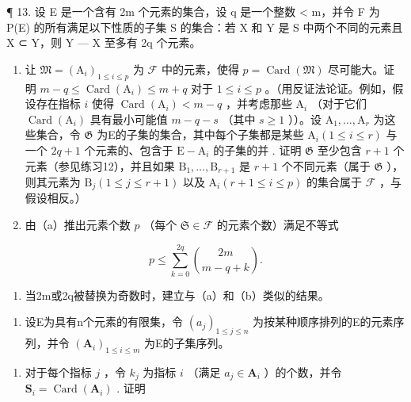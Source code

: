 ¶ 13. 设 E 是一个含有 2m 个元素的集合，设 q 是一个整数 \textless{} m，并令 F 为 P(E) 的所有满足以下性质的子集 S 的集合：若 X 和 Y 是 S 中两个不同的元素且 X ⊂ Y，则 Y --- X 至多有 2q 个元素。

\begin{enumerate}
\def\labelenumi{(\alph{enumi})}
\item
  让 \(\mathfrak{M} = (\mathrm{A}_i)_{1\leqslant i\leqslant p}\) 为 \(\mathcal{F}\) 中的元素，使得 \(p = \operatorname{Card}(\mathfrak{M})\) 尽可能大。证明 \(m - q\leqslant \operatorname{Card}(\mathrm{A}_i)\leqslant m + q\) 对于 \(1\leqslant i\leqslant p\) 。（用反证法论证。例如，假设存在指标 \(i\) 使得 \(\operatorname{Card}(\mathrm{A}_i) < m - q\) ，并考虑那些 \(\mathrm{A}_i\) （对于它们 \(\operatorname{Card}(\mathrm{A}_i)\) 具有最小可能值 \(m - q - s\) （其中 \(s\geqslant 1\) ））。设 \(\mathrm{A}_1,\ldots ,\mathrm{A}_r\) 为这些集合，令 \(\mathfrak{G}\) 为E的子集的集合，其中每个子集都是某些 \(\mathrm{A}_i(1\leqslant i\leqslant r)\) 与一个 \(2q + 1\) 个元素的、包含于 \(\mathrm{E} - \mathrm{A}_i\) 的子集的并 . 证明 \(\mathfrak{G}\) 至少包含 \(r + 1\) 个元素（参见练习12），并且如果 \(\mathrm{B}_1,\ldots ,\mathrm{B}_{r + 1}\) 是 \(r + 1\) 个不同元素（属于 \(\mathfrak{G}\) ），则其元素为 \(\mathrm{B}_j(1\leqslant j\leqslant r + 1)\) 以及 \(\mathrm{A}_i(r + 1\leqslant i\leqslant p)\) 的集合属于 \(\mathcal{F}\) ，与假设相反。）
\item
  由（a）推出元素个数 \(p\) （每个 \(\mathfrak{S} \in \mathcal{F}\) 的元素个数）满足不等式
\end{enumerate}

\[
p \leqslant \sum_ {k = 0} ^ {2 q} \binom {2 m} {m - q + k}.
\]

\begin{enumerate}
\def\labelenumi{(\alph{enumi})}
\setcounter{enumi}{2}
\tightlist
\item
  当2m或2q被替换为奇数时，建立与（a）和（b）类似的结果。
\end{enumerate}

\begin{enumerate}
\def\labelenumi{\arabic{enumi}.}
\setcounter{enumi}{13}
\tightlist
\item
  设E为具有n个元素的有限集，令 \((a_{j})_{1 \leqslant j \leqslant n}\) 为按某种顺序排列的E的元素序列，并令 \((\mathbf{A}_{i})_{1 \leqslant i \leqslant m}\) 为E的子集序列。
\end{enumerate}

\begin{enumerate}
\def\labelenumi{(\alph{enumi})}
\tightlist
\item
  对于每个指标 \(j\) ，令 \(k_{j}\) 为指标 \(i\) （满足 \(a_{j} \in \mathbf{A}_{i}\) ）的个数，并令 \(\mathbf{S}_{i} = \operatorname{Card}(\mathbf{A}_{i})\) . 证明
\end{enumerate}

